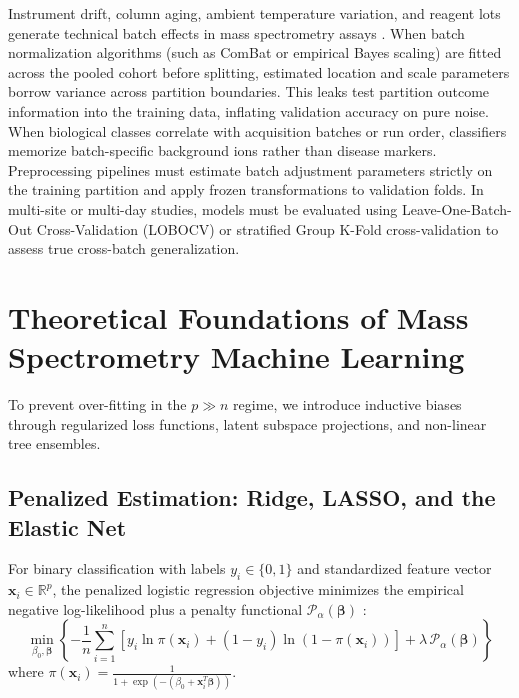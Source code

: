 \documentclass[11pt,oneside]{book}
\begin{document}
Instrument drift, column aging, ambient temperature variation, and reagent lots generate technical batch effects in mass spectrometry assays \cite{broadhurst2006statistical}. When batch normalization algorithms (such as ComBat or empirical Bayes scaling) are fitted across the pooled cohort before splitting, estimated location and scale parameters borrow variance across partition boundaries. This leaks test partition outcome information into the training data, inflating validation accuracy on pure noise. When biological classes correlate with acquisition batches or run order, classifiers memorize batch-specific background ions rather than disease markers. Preprocessing pipelines must estimate batch adjustment parameters strictly on the training partition and apply frozen transformations to validation folds. In multi-site or multi-day studies, models must be evaluated using Leave-One-Batch-Out Cross-Validation (LOBOCV) or stratified Group K-Fold cross-validation to assess true cross-batch generalization.

\clearpage

\section{Theoretical Foundations of Mass Spectrometry Machine Learning}

To prevent over-fitting in the $p \gg n$ regime, we introduce inductive biases through regularized loss functions, latent subspace projections, and non-linear tree ensembles.

\subsection{Penalized Estimation: Ridge, LASSO, and the Elastic Net}

For binary classification with labels $y_i \in \{0, 1\}$ and standardized feature vector $\mathbf{x}_i \in \mathbb{R}^p$, the penalized logistic regression objective minimizes the empirical negative log-likelihood plus a penalty functional $\mathcal{P}_\alpha(\boldsymbol{\beta})$ \cite{hoerl1970ridge, tibshirani1996regression}:
\begin{equation}
\label{eq:penalized_objective}
\min_{\beta_0, \boldsymbol{\beta}} \left\{ -\frac{1}{n} \sum_{i=1}^n \left[ y_i \ln \pi(\mathbf{x}_i) + (1 - y_i) \ln(1 - \pi(\mathbf{x}_i)) \right] + \lambda \, \mathcal{P}_\alpha(\boldsymbol{\beta}) \right\}
\end{equation}
where $\pi(\mathbf{x}_i) = \frac{1}{1 + \exp(-(\beta_0 + \mathbf{x}_i^T \boldsymbol{\beta}))}$.
\end{document}
